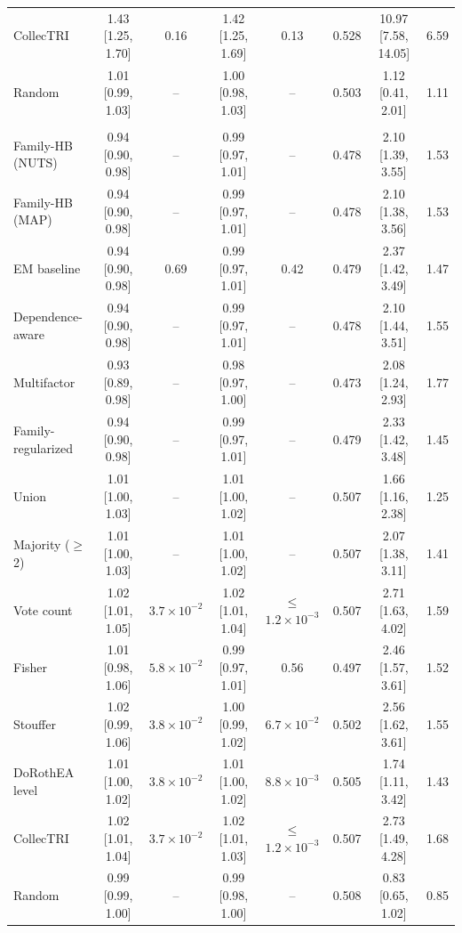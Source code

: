 \documentclass[11pt,a4paper]{article}
\begin{document}
\begin{table}[tbp]
{\begin{tabular}{@{}lccccccc@{}}
CollecTRI & 1.43 [1.25, 1.70] & 0.16 & 1.42 [1.25, 1.69] & 0.13 & 0.528 & 10.97 [7.58, 14.05] & 6.59 \\
\addlinespace[2pt]
Random & 1.01 [0.99, 1.03] & -- & 1.00 [0.98, 1.03] & -- & 0.503 & 1.12 [0.41, 2.01] & 1.11 \\
\addlinespace[3pt]
\multicolumn{8}{@{}l}{\emph{Pooled perturbation: 484{,}173 evaluable edges, 46{,}945 positives, 110 TFs}} \\
Family-HB (NUTS) & 0.94 [0.90, 0.98] & -- & 0.99 [0.97, 1.01] & -- & 0.478 & 2.10 [1.39, 3.55] & 1.53 \\
Family-HB (MAP) & 0.94 [0.90, 0.98] & -- & 0.99 [0.97, 1.01] & -- & 0.478 & 2.10 [1.38, 3.56] & 1.53 \\
EM baseline & 0.94 [0.90, 0.98] & 0.69 & 0.99 [0.97, 1.01] & 0.42 & 0.479 & 2.37 [1.42, 3.49] & 1.47 \\
Dependence-aware & 0.94 [0.90, 0.98] & -- & 0.99 [0.97, 1.01] & -- & 0.478 & 2.10 [1.44, 3.51] & 1.55 \\
Multifactor & 0.93 [0.89, 0.98] & -- & 0.98 [0.97, 1.00] & -- & 0.473 & 2.08 [1.24, 2.93] & 1.77 \\
Family-regularized & 0.94 [0.90, 0.98] & -- & 0.99 [0.97, 1.01] & -- & 0.479 & 2.33 [1.42, 3.48] & 1.45 \\
\addlinespace[2pt]
Union & 1.01 [1.00, 1.03] & -- & 1.01 [1.00, 1.02] & -- & 0.507 & 1.66 [1.16, 2.38] & 1.25 \\
Majority ($\geq$2) & 1.01 [1.00, 1.03] & -- & 1.01 [1.00, 1.02] & -- & 0.507 & 2.07 [1.38, 3.11] & 1.41 \\
Vote count & 1.02 [1.01, 1.05] & $3.7\times 10^{-2}$ & 1.02 [1.01, 1.04] & $\leq$$1.2\times 10^{-3}$ & 0.507 & 2.71 [1.63, 4.02] & 1.59 \\
Fisher & 1.01 [0.98, 1.06] & $5.8\times 10^{-2}$ & 0.99 [0.97, 1.01] & 0.56 & 0.497 & 2.46 [1.57, 3.61] & 1.52 \\
Stouffer & 1.02 [0.99, 1.06] & $3.8\times 10^{-2}$ & 1.00 [0.99, 1.02] & $6.7\times 10^{-2}$ & 0.502 & 2.56 [1.62, 3.61] & 1.55 \\
\addlinespace[2pt]
DoRothEA level & 1.01 [1.00, 1.02] & $3.8\times 10^{-2}$ & 1.01 [1.00, 1.02] & $8.8\times 10^{-3}$ & 0.505 & 1.74 [1.11, 3.42] & 1.43 \\
CollecTRI & 1.02 [1.01, 1.04] & $3.7\times 10^{-2}$ & 1.02 [1.01, 1.03] & $\leq$$1.2\times 10^{-3}$ & 0.507 & 2.73 [1.49, 4.28] & 1.68 \\
\addlinespace[2pt]
Random & 0.99 [0.99, 1.00] & -- & 0.99 [0.98, 1.00] & -- & 0.508 & 0.83 [0.65, 1.02] & 0.85 \\

\end{tabular}}
\end{table}
\end{document}
